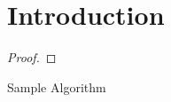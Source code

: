 \section{Introduction}
\label{sec:introduction}

\lipsum[1-3]

\begin{definition}
	\lipsum[1]
\end{definition}

\begin{theorem}
	\lipsum[1]
	\begin{proof}
	\lipsum[1]
	\end{proof}
\end{theorem}

\begin{algorithm}
\caption{Sample Algorithm}
\lipsum[1]
\end{algorithm}